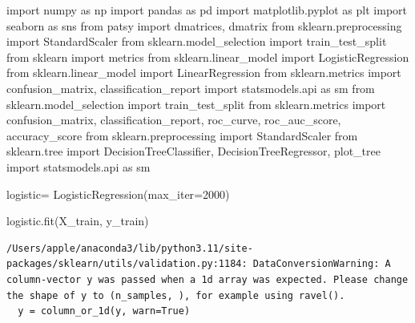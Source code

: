 \documentclass[
  11pt,
  letterpaper,
  DIV=11,
  numbers=noendperiod]{scrartcl}
\newenvironment{Shaded}{\begin{snugshade}}{\end{snugshade}}
\newcommand{\DecValTok}[1]{\textcolor[rgb]{0.68,0.00,0.00}{#1}}
\newcommand{\ImportTok}[1]{\textcolor[rgb]{0.00,0.46,0.62}{#1}}
\newcommand{\NormalTok}[1]{\textcolor[rgb]{0.00,0.23,0.31}{#1}}
\newcommand{\OperatorTok}[1]{\textcolor[rgb]{0.37,0.37,0.37}{#1}}
\begin{document}
\begin{Shaded}
\begin{Highlighting}[]
\ImportTok{import}\NormalTok{ numpy }\ImportTok{as}\NormalTok{ np}
\ImportTok{import}\NormalTok{ pandas }\ImportTok{as}\NormalTok{ pd }
\ImportTok{import}\NormalTok{ matplotlib.pyplot }\ImportTok{as}\NormalTok{ plt}
\ImportTok{import}\NormalTok{ seaborn }\ImportTok{as}\NormalTok{ sns}
\ImportTok{from}\NormalTok{ patsy }\ImportTok{import}\NormalTok{ dmatrices, dmatrix}
\ImportTok{from}\NormalTok{ sklearn.preprocessing }\ImportTok{import}\NormalTok{ StandardScaler}
\ImportTok{from}\NormalTok{ sklearn.model\_selection }\ImportTok{import}\NormalTok{ train\_test\_split}
\ImportTok{from}\NormalTok{ sklearn }\ImportTok{import}\NormalTok{ metrics}
\ImportTok{from}\NormalTok{ sklearn.linear\_model }\ImportTok{import}\NormalTok{ LogisticRegression}
\ImportTok{from}\NormalTok{ sklearn.linear\_model }\ImportTok{import}\NormalTok{ LinearRegression}
\ImportTok{from}\NormalTok{ sklearn.metrics }\ImportTok{import}\NormalTok{ confusion\_matrix, classification\_report}
\ImportTok{import}\NormalTok{ statsmodels.api }\ImportTok{as}\NormalTok{ sm}
\ImportTok{from}\NormalTok{ sklearn.model\_selection }\ImportTok{import}\NormalTok{ train\_test\_split}
\ImportTok{from}\NormalTok{ sklearn.metrics }\ImportTok{import}\NormalTok{ confusion\_matrix, classification\_report, roc\_curve, roc\_auc\_score, accuracy\_score}
\ImportTok{from}\NormalTok{ sklearn.preprocessing }\ImportTok{import}\NormalTok{ StandardScaler}
\ImportTok{from}\NormalTok{ sklearn.tree }\ImportTok{import}\NormalTok{ DecisionTreeClassifier, DecisionTreeRegressor, plot\_tree}
\ImportTok{import}\NormalTok{ statsmodels.api }\ImportTok{as}\NormalTok{ sm}
\end{Highlighting}
\end{Shaded}

\begin{Shaded}
\begin{Highlighting}[]
\NormalTok{logistic}\OperatorTok{=}\NormalTok{ LogisticRegression(max\_iter}\OperatorTok{=}\DecValTok{2000}\NormalTok{)}
\end{Highlighting}
\end{Shaded}

\begin{Shaded}
\begin{Highlighting}[]
\NormalTok{logistic.fit(X\_train, y\_train)}
\end{Highlighting}
\end{Shaded}

\begin{verbatim}
/Users/apple/anaconda3/lib/python3.11/site-packages/sklearn/utils/validation.py:1184: DataConversionWarning: A column-vector y was passed when a 1d array was expected. Please change the shape of y to (n_samples, ), for example using ravel().
  y = column_or_1d(y, warn=True)
\end{verbatim}
\end{document}
